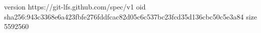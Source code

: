 version https://git-lfs.github.com/spec/v1
oid sha256:943c3368e6a423fbfe276fddfcac82d05c6c537bc23fcd35d136cbc50c5e3a84
size 5592560
